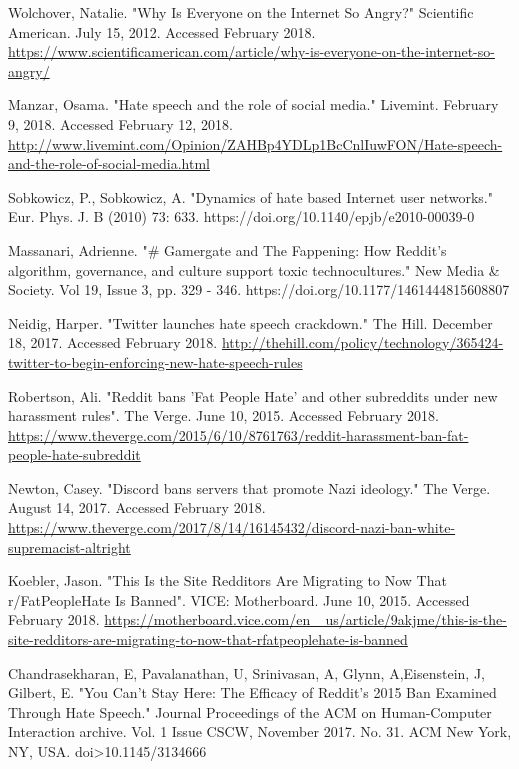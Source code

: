 \documentclass[twoside,twocolumn]{article}
\begin{document}
\begin{thebibliography}{99} %

 Wolchover, Natalie. "Why Is Everyone on the Internet So Angry?" Scientific American. July 15, 2012. Accessed February 2018. \url{https://www.scientificamerican.com/article/why-is-everyone-on-the-internet-so-angry/}
 
 Manzar, Osama. "Hate speech and the role of social media." Livemint. February 9, 2018. Accessed February 12, 2018. \url{http://www.livemint.com/Opinion/ZAHBp4YDLp1BcCnlIuwFON/Hate-speech-and-the-role-of-social-media.html}
 
 Sobkowicz, P., Sobkowicz, A. "Dynamics of hate based Internet user networks." Eur. Phys. J. B (2010) 73: 633. https://doi.org/10.1140/epjb/e2010-00039-0

 Massanari, Adrienne. "\# Gamergate and The Fappening: How Reddit’s algorithm, governance, and culture support toxic technocultures." New Media \& Society. Vol 19, Issue 3, pp. 329 - 346. https://doi.org/10.1177/1461444815608807

 Neidig, Harper. "Twitter launches hate speech crackdown." The Hill. December 18, 2017. Accessed February 2018. \url{http://thehill.com/policy/technology/365424-twitter-to-begin-enforcing-new-hate-speech-rules}

 Robertson, Ali. "Reddit bans 'Fat People Hate' and other subreddits under new harassment rules". The Verge. June 10, 2015. Accessed February 2018. \url{https://www.theverge.com/2015/6/10/8761763/reddit-harassment-ban-fat-people-hate-subreddit}

 Newton, Casey. "Discord bans servers that promote Nazi ideology." The Verge. August 14, 2017. Accessed February 2018. \url{https://www.theverge.com/2017/8/14/16145432/discord-nazi-ban-white-supremacist-altright}
  
 Koebler, Jason. "This Is the Site Redditors Are Migrating to Now That r/FatPeopleHate Is Banned". VICE: Motherboard. June 10, 2015. Accessed February 2018. \url{https://motherboard.vice.com/en\_ us/article/9akjme/this-is-the-site-redditors-are-migrating-to-now-that-rfatpeoplehate-is-banned}	 

 Chandrasekharan, E, Pavalanathan, U, Srinivasan, A, Glynn, A,Eisenstein, J, Gilbert, E. "You Can't Stay Here: The Efficacy of Reddit's 2015 Ban Examined Through Hate Speech." Journal Proceedings of the ACM on Human-Computer Interaction archive. Vol. 1 Issue CSCW, November 2017. No. 31. ACM New York, NY, USA. doi>10.1145/3134666


\end{thebibliography}
\end{document}
